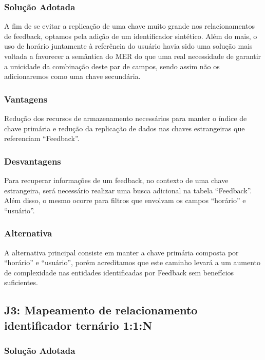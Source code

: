 \subsubsection{Solução Adotada}

A fim de se evitar a replicação de uma chave muito grande nos relacionamentos
de feedback, optamos pela adição de um identificador sintético. Além do mais, o
uso de horário juntamente à referência do usuário havia sido uma solução mais
voltada a favorecer a semântica do MER do que uma real necessidade de garantir
a unicidade da combinação deste par de campos, sendo assim não os adicionaremos
como uma chave secundária.

\subsubsection{Vantagens}

Redução dos recursos de armazenamento necessários para manter o índice de chave
primária e redução da replicação de dados nas chaves estrangeiras que
referenciam ``Feedback''.

\subsubsection{Desvantagens}

Para recuperar informações de um feedback, no contexto de uma chave estrangeira,
será necessário realizar uma busca adicional na tabela ``Feedback''. Além disso,
o mesmo ocorre para filtros que envolvam os campos ``horário'' e ``usuário''.

\subsubsection{Alternativa}

A alternativa principal consiste em manter a chave primária composta por
``horário'' e ``usuário'', porém acreditamos que este caminho levará a um
aumento de complexidade nas entidades identificadas por Feedback sem benefícios
suficientes.

\subsection{\textbf{J3:} Mapeamento de relacionamento identificador ternário 1:1:N}

\subsubsection{Solução Adotada}

